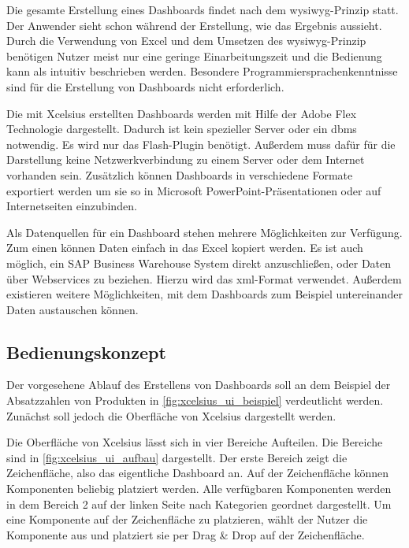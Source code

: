 \begin{onehalfspacing}
Die gesamte Erstellung eines Dashboards findet nach dem \gls{wysiwyg}-Prinzip statt. Der Anwender sieht schon während der Erstellung, wie das Ergebnis aussieht. Durch die Verwendung von Excel und dem Umsetzen des \gls{wysiwyg}-Prinzip benötigen Nutzer meist nur eine geringe Einarbeitungszeit und die Bedienung kann als intuitiv beschrieben werden. Besondere Programmiersprachenkenntnisse sind für die Erstellung von Dashboards nicht erforderlich.

Die mit \gls{Xcelsius} erstellten Dashboards werden mit Hilfe der Adobe Flex Technologie dargestellt. Dadurch ist kein spezieller Server oder ein \gls{dbms} notwendig. Es wird nur das Flash-Plugin benötigt. Außerdem muss dafür für die Darstellung keine Netzwerkverbindung zu einem Server oder dem Internet vorhanden sein.  Zusätzlich können Dashboards in verschiedene Formate exportiert werden um sie so in Microsoft PowerPoint-Präsentationen oder auf Internetseiten einzubinden.

Als Datenquellen für ein Dashboard stehen mehrere Möglichkeiten zur Verfügung. Zum einen können Daten einfach in das Excel kopiert werden.  Es ist auch möglich, ein SAP Business Warehouse System direkt anzuschließen, oder Daten über Webservices zu beziehen. Hierzu wird das \gls{xml}-Format verwendet. Außerdem existieren weitere Möglichkeiten, mit dem Dashboards zum Beispiel untereinander Daten austauschen können.

\subsection{Bedienungskonzept}
Der vorgesehene Ablauf des Erstellens von Dashboards soll an dem Beispiel der Absatzzahlen von Produkten in \vref{fig:xcelsius_ui_beispiel} verdeutlicht werden. Zunächst soll jedoch die Oberfläche von \gls{Xcelsius} dargestellt werden.

Die Oberfläche von \gls{Xcelsius} lässt sich in vier Bereiche Aufteilen. Die Bereiche sind in \vref{fig:xcelsius_ui_aufbau} dargestellt. Der erste Bereich zeigt die Zeichenfläche, also das eigentliche Dashboard an. Auf der Zeichenfläche können Komponenten beliebig platziert werden. Alle verfügbaren Komponenten werden in dem Bereich 2 auf der linken Seite nach Kategorien geordnet dargestellt. Um eine Komponente auf der Zeichenfläche zu platzieren, wählt der Nutzer die Komponente aus und platziert sie per Drag \& Drop auf der Zeichenfläche. 


\end{onehalfspacing}

